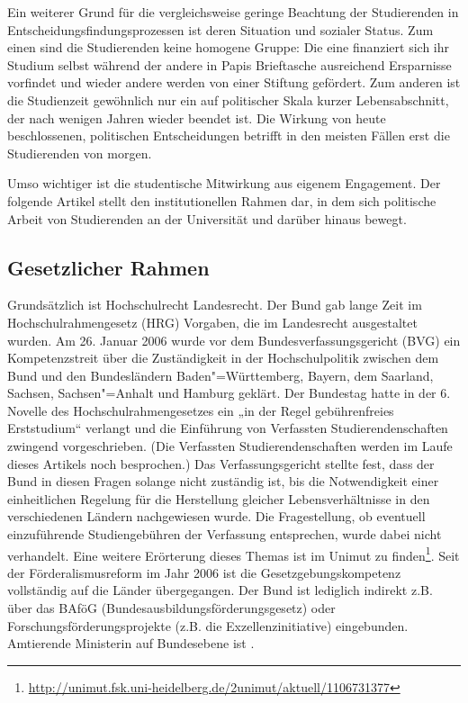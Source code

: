 Ein weiterer Grund für die vergleichsweise geringe Beachtung der
Studierenden in Entscheidungsfindungsprozessen ist deren Situation und
sozialer Status. Zum einen sind die Studierenden keine homogene Gruppe:
Die eine finanziert sich ihr Studium selbst während der andere in Papis
Brieftasche ausreichend Ersparnisse vorfindet und wieder andere werden von
einer Stiftung gefördert. Zum anderen ist die Studienzeit gewöhnlich nur
ein auf politischer Skala kurzer Lebensabschnitt, der nach wenigen Jahren
wieder beendet ist. Die Wirkung von heute beschlossenen, politischen
Entscheidungen betrifft in den meisten Fällen erst die Studierenden von
morgen.

Umso wichtiger ist die studentische Mitwirkung aus eigenem Engagement. Der
folgende Artikel stellt den institutionellen Rahmen dar, in dem sich
politische Arbeit von Studierenden an der Universität und darüber hinaus
bewegt.

\subsection{Gesetzlicher Rahmen}
Grundsätzlich ist Hochschulrecht Landesrecht. Der Bund gab lange Zeit im
Hochschulrahmengesetz (HRG) Vorgaben, die im Landesrecht ausgestaltet
wurden. Am 26. Januar 2006 wurde vor dem Bundesverfassungsgericht (BVG)
ein Kompetenzstreit über die Zuständigkeit in der Hochschulpolitik
zwischen dem Bund und den Bundesländern Baden"=Württemberg, Bayern, dem
Saarland, Sachsen, Sachsen"=Anhalt und Hamburg geklärt. Der Bundestag hatte
in der 6. Novelle des Hochschulrahmengesetzes ein „in der Regel
gebührenfreies Erststudium“ verlangt und die Einführung von Verfassten
Studierendenschaften zwingend vorgeschrieben. (Die Verfassten
Studierendenschaften werden im Laufe dieses Artikels noch besprochen.) Das
Verfassungsgericht stellte fest, dass der Bund in diesen Fragen solange
nicht zuständig ist, bis die Notwendigkeit einer einheitlichen Regelung
für die Herstellung gleicher Lebensverhältnisse in den verschiedenen
Ländern nachgewiesen wurde. Die Fragestellung, ob eventuell einzuführende
Studiengebühren der Verfassung entsprechen, wurde dabei nicht verhandelt.
Eine weitere Erörterung dieses Themas ist im Unimut zu finden\footnote{\url{http://unimut.fsk.uni-heidelberg.de/2unimut/aktuell/1106731377}}.
Seit der Förderalismusreform im Jahr 2006 ist die Gesetzgebungskompetenz
vollständig auf die Länder übergegangen. Der Bund ist lediglich indirekt
z.B. über das BAföG (Bundesausbildungsförderungsgesetz) oder
Forschungsförderungsprojekte (z.B. die Exzellenzinitiative) eingebunden.
Amtierende Ministerin auf Bundesebene ist \wissenschaftsministerbund.


